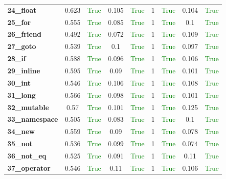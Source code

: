 \documentclass{article}
\begin{document}
\begin{xltabular}{\textwidth}{lcccccccc}
\textbf{24\_float}& 0.623&\textcolor{green}{True}& 0.105&\textcolor{green}{True}& 1&\textcolor{green}{True}& 0.104&\textcolor{green}{True} \\[0.5ex]
\textbf{25\_for}& 0.555&\textcolor{green}{True}& 0.085&\textcolor{green}{True}& 1&\textcolor{green}{True}& 0.1&\textcolor{green}{True} \\[0.5ex]
\textbf{26\_friend}& 0.492&\textcolor{green}{True}& 0.072&\textcolor{green}{True}& 1&\textcolor{green}{True}& 0.109&\textcolor{green}{True} \\[0.5ex]
\textbf{27\_goto}& 0.539&\textcolor{green}{True}& 0.1&\textcolor{green}{True}& 1&\textcolor{green}{True}& 0.097&\textcolor{green}{True} \\[0.5ex]
\textbf{28\_if}& 0.588&\textcolor{green}{True}& 0.096&\textcolor{green}{True}& 1&\textcolor{green}{True}& 0.106&\textcolor{green}{True} \\[0.5ex]
\textbf{29\_inline}& 0.595&\textcolor{green}{True}& 0.09&\textcolor{green}{True}& 1&\textcolor{green}{True}& 0.101&\textcolor{green}{True} \\[0.5ex]
\textbf{30\_int}& 0.546&\textcolor{green}{True}& 0.106&\textcolor{green}{True}& 1&\textcolor{green}{True}& 0.108&\textcolor{green}{True} \\[0.5ex]
\textbf{31\_long}& 0.566&\textcolor{green}{True}& 0.098&\textcolor{green}{True}& 1&\textcolor{green}{True}& 0.101&\textcolor{green}{True} \\[0.5ex]
\textbf{32\_mutable}& 0.57&\textcolor{green}{True}& 0.101&\textcolor{green}{True}& 1&\textcolor{green}{True}& 0.125&\textcolor{green}{True} \\[0.5ex]
\textbf{33\_namespace}& 0.505&\textcolor{green}{True}& 0.083&\textcolor{green}{True}& 1&\textcolor{green}{True}& 0.1&\textcolor{green}{True} \\[0.5ex]
\textbf{34\_new}& 0.559&\textcolor{green}{True}& 0.09&\textcolor{green}{True}& 1&\textcolor{green}{True}& 0.078&\textcolor{green}{True} \\[0.5ex]
\textbf{35\_not}& 0.536&\textcolor{green}{True}& 0.099&\textcolor{green}{True}& 1&\textcolor{green}{True}& 0.074&\textcolor{green}{True} \\[0.5ex]
\textbf{36\_not\_eq}& 0.525&\textcolor{green}{True}& 0.091&\textcolor{green}{True}& 1&\textcolor{green}{True}& 0.11&\textcolor{green}{True} \\[0.5ex]
\textbf{37\_operator}& 0.546&\textcolor{green}{True}& 0.11&\textcolor{green}{True}& 1&\textcolor{green}{True}& 0.106&\textcolor{green}{True} \\[0.5ex]

\end{xltabular}
\end{document}
